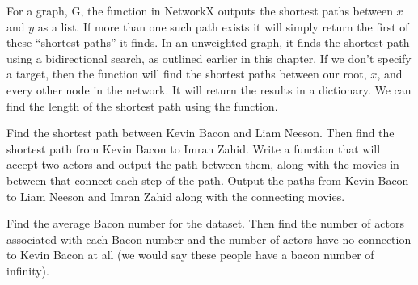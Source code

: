 For a graph, G, the  function in NetworkX outputs the shortest paths between $x$ and $y$ as a list. If more than one such path exists
it will simply return the first of these ``shortest paths'' it finds. In an unweighted graph, it finds
the shortest path using a bidirectional search, as outlined earlier in this chapter. If we don't specify a target, then the function will find the shortest paths between our root, $x$, and every
other node in the network.  It will return the results in a dictionary. We can find the
length of the shortest path using the  function.

\begin{problem}
Find the shortest path between Kevin Bacon and Liam Neeson. Then find the shortest path from Kevin Bacon to Imran Zahid. Write a function that will accept two actors and output
the path between them, along with the movies in between that connect each step of the path. Output the paths from Kevin Bacon to Liam Neeson and Imran Zahid along with the connecting movies.
\end{problem}

\begin{problem}
Find the average Bacon number for the dataset. Then find the number of actors 
associated with each Bacon number and the number of actors have no connection
 to Kevin Bacon at all (we would say these people have a bacon number of infinity).
\end{problem}

